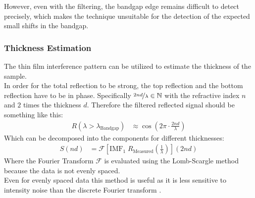 \documentclass[
	oneside,
	parskip=half,
	a4paper,
]{scrbook}
\begin{document}
However, even with the filtering, the bandgap edge remains difficult to detect precisely, which makes the technique unsuitable for the detection of the expected small shifts in the bandgap.

\subsubsection{Thickness Estimation}
\label{sec:thickness}
The thin film interference pattern can be utilized to estimate the thickness of the sample.\\
In order for the total reflection to be strong, the top reflection and the bottom reflection have to be in phase.
Specifically $\nicefrac{2nd}{\lambda}\in\mathbb{N} $ with the refractive index $n$ and $2$ times the thickness $d$.
Therefore the filtered reflected signal should be something like this:
\begin{align}
	R(\lambda > \lambda_\text{Bandgap}) &\approx \cos \left( 2 \pi \cdot \frac{2 n d}{\lambda} \right)
\end{align}
Which can be decomposed into the components for different thicknesses:
\begin{align}
	S(nd) &= \mathcal{F}\left[ \text{IMF}_1\; R_\text{Measured}\left(\frac{1}{\lambda}\right)\right]( 2 nd)
\end{align}
Where the Fourier Transform $\mathcal{F}$ is evaluated using the Lomb-Scargle method \cite{scargle} because the data is not evenly spaced.\\
Even for evenly spaced data this method is useful as it is less sensitive to intensity noise than the discrete Fourier transform \cite{scargle}.
\end{document}
